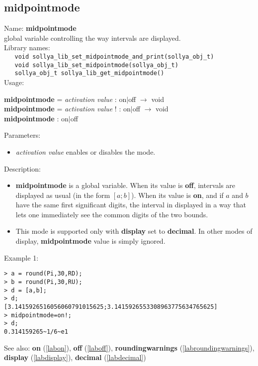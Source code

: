 \subsection{midpointmode}
\label{labmidpointmode}
\noindent Name: \textbf{midpointmode}\\
\phantom{aaa}global variable controlling the way intervals are displayed.\\[0.2cm]
\noindent Library names:\\
\verb|   void sollya_lib_set_midpointmode_and_print(sollya_obj_t)|\\
\verb|   void sollya_lib_set_midpointmode(sollya_obj_t)|\\
\verb|   sollya_obj_t sollya_lib_get_midpointmode()|\\[0.2cm]
\noindent Usage: 
\begin{center}
\textbf{midpointmode} = \emph{activation value} : \textsf{on$|$off} $\rightarrow$ \textsf{void}\\
\textbf{midpointmode} = \emph{activation value} ! : \textsf{on$|$off} $\rightarrow$ \textsf{void}\\
\textbf{midpointmode} : \textsf{on$|$off}\\
\end{center}
Parameters: 
\begin{itemize}
\item \emph{activation value} enables or disables the mode.
\end{itemize}
\noindent Description: \begin{itemize}

\item \textbf{midpointmode} is a global variable. When its value is \textbf{off}, intervals are displayed
   as usual (in the form $\left[ a;b\right]$).
   When its value is \textbf{on}, and if $a$ and $b$ have the same first significant digits,
   the interval in displayed in a way that lets one immediately see the common
   digits of the two bounds.

\item This mode is supported only with \textbf{display} set to \textbf{decimal}. In other modes of 
   display, \textbf{midpointmode} value is simply ignored.
\end{itemize}
\noindent Example 1: 
\begin{center}\begin{minipage}{15cm}\begin{Verbatim}[frame=single]
> a = round(Pi,30,RD);
> b = round(Pi,30,RU);
> d = [a,b];
> d;
[3.1415926516056060791015625;3.1415926553308963775634765625]
> midpointmode=on!;
> d;
0.314159265~1/6~e1
\end{Verbatim}
\end{minipage}\end{center}
See also: \textbf{on} (\ref{labon}), \textbf{off} (\ref{laboff}), \textbf{roundingwarnings} (\ref{labroundingwarnings}), \textbf{display} (\ref{labdisplay}), \textbf{decimal} (\ref{labdecimal})
